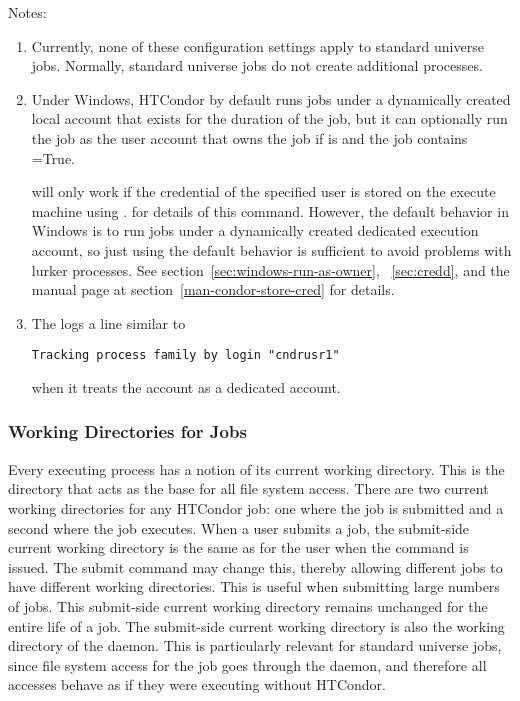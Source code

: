 Notes:
\begin{enumerate}

\item{ Currently, none of these configuration settings apply to
standard universe jobs.  Normally, standard universe jobs do not
create additional processes. }

\item{
Under Windows, HTCondor by default
runs jobs under a dynamically created local account that exists for
the duration of the job, but it can optionally run the job as the user
account that owns the job if  is
 and the job contains =True. 

 will only work if the credential
of the specified user is stored on the execute machine
using .
for details of this command.  However, the default behavior in Windows
is to run jobs under a dynamically created dedicated execution account,
so just using the default behavior is sufficient to avoid problems
with lurker processes.
See section~\ref{sec:windows-run-as-owner}, ~\ref{sec:credd},
and the  manual page at section~\ref{man-condor-store-cred}
for details.
}
\item {
The  logs a line similar to
\begin{verbatim}
Tracking process family by login "cndrusr1"
\end{verbatim}
when it treats the account as a dedicated account.
}
\end{enumerate}


\subsubsection{\label{sec:DirOfJob}Working Directories for Jobs}

Every executing process has a notion of its current working directory.
This is the directory that acts as the base for all file system
access. 
There are two current working directories for any HTCondor job:
one where the job is submitted and a
second where the job executes.
When a user submits a job,
the submit-side current working directory is
the same as for the user when the  command
is issued.
The  submit command may change this,
thereby allowing different jobs to have different working
directories.
This is useful when submitting large numbers of jobs.
This submit-side current working directory remains unchanged for the
entire life of a job. 
The submit-side current working directory is also 
the working directory of the  daemon.
This is particularly relevant for standard universe jobs,
since file system
access for the job goes through the  daemon, and
therefore all accesses behave as if they were executing without
HTCondor.

